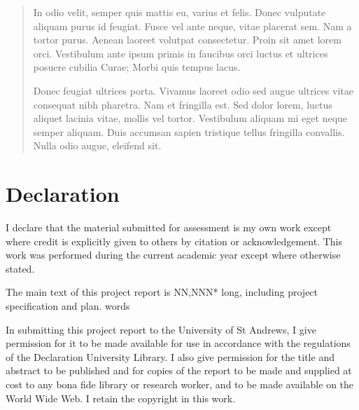
\begin{abstract}
	In odio velit, semper quis mattis eu, varius et felis. Donec vulputate aliquam purus id feugiat. Fusce vel ante neque, vitae placerat sem. Nam a tortor purus. Aenean laoreet volutpat consectetur. Proin sit amet lorem orci. Vestibulum ante ipsum primis in faucibus orci luctus et ultrices posuere cubilia Curae; Morbi quis tempus lacus.


	Donec feugiat ultrices porta. Vivamus laoreet odio sed augue ultrices vitae consequat nibh pharetra. Nam et fringilla est. Sed dolor lorem, luctus aliquet lacinia vitae, mollis vel tortor. Vestibulum aliquam mi eget neque semper aliquam. Duis accumsan sapien tristique tellus fringilla convallis. Nulla odio augue, eleifend sit.
\end{abstract}

\sectionfont{
	\sectionrule{0pt}{0pt}{-10pt}{0.8pt}
}

\section*{Declaration}
I declare that the material submitted for assessment is my own work except where credit is explicitly given to others by citation or acknowledgement. This work was performed during the current academic year except where otherwise stated.

The main text of this project report is NN,NNN* long, including project specification and plan. words

In submitting this project report to the University of St Andrews, I give permission for it to be made available for use in accordance with the regulations of the Declaration University Library. I also give permission for the title and abstract to be published and for copies of the report to be made and supplied at cost to any bona fide library or research worker, and to be made available on the World Wide Web. I retain the copyright in this work.
